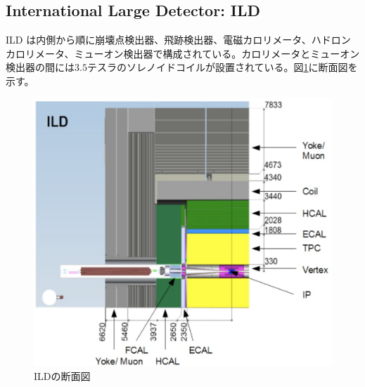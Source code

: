 \subsection{International Large Detector: ILD}
ILD \cite{tdr2}は内側から順に崩壊点検出器、飛跡検出器、電磁カロリメータ、ハドロンカロリメータ、ミューオン検出器で構成されている。カロリメータとミューオン検出器の間には$3.5$テスラのソレノイドコイルが設置されている。図\ref{ild}に断面図を示す。
\begin{figure}[H]
	\begin{center}
 \includegraphics[keepaspectratio, scale=0.25]
 	{Figure/Introduction/ild.png}
 		\caption {ILDの断面図}
 		\label{ild}
	\end{center}
\end{figure}

